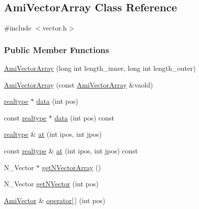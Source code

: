 \hypertarget{classamici_1_1_ami_vector_array}{}\subsection{Ami\+Vector\+Array Class Reference}
\label{classamici_1_1_ami_vector_array}


{\ttfamily \#include $<$vector.\+h$>$}

\subsubsection*{Public Member Functions}
\begin{DoxyCompactItemize}
\item 
\mbox{\hyperlink{classamici_1_1_ami_vector_array_a331a7814672b817a7c38328e78eaaedd}{Ami\+Vector\+Array}} (long int length\+\_\+inner, long int length\+\_\+outer)
\item 
\mbox{\hyperlink{classamici_1_1_ami_vector_array_a3b40abc4d3e4fc0a097834dd56666f41}{Ami\+Vector\+Array}} (const \mbox{\hyperlink{classamici_1_1_ami_vector_array}{Ami\+Vector\+Array}} \&vaold)
\item 
\mbox{\hyperlink{namespaceamici_a1bdce28051d6a53868f7ccbf5f2c14a3}{realtype}} $\ast$ \mbox{\hyperlink{classamici_1_1_ami_vector_array_a5c1b7077b31d3a3be1370ea3e42d13a3}{data}} (int pos)
\item 
const \mbox{\hyperlink{namespaceamici_a1bdce28051d6a53868f7ccbf5f2c14a3}{realtype}} $\ast$ \mbox{\hyperlink{classamici_1_1_ami_vector_array_a862fe8497e94d2fac86e92a07db04cd7}{data}} (int pos) const
\item 
\mbox{\hyperlink{namespaceamici_a1bdce28051d6a53868f7ccbf5f2c14a3}{realtype}} \& \mbox{\hyperlink{classamici_1_1_ami_vector_array_a214f110ad614eb97ec2c6f3b6a9f2c8c}{at}} (int ipos, int jpos)
\item 
const \mbox{\hyperlink{namespaceamici_a1bdce28051d6a53868f7ccbf5f2c14a3}{realtype}} \& \mbox{\hyperlink{classamici_1_1_ami_vector_array_ab5d671e207475d1f45227a7faaeebfac}{at}} (int ipos, int jpos) const
\item 
N\+\_\+\+Vector $\ast$ \mbox{\hyperlink{classamici_1_1_ami_vector_array_a5ccad03e89676a4b404322899579f961}{get\+N\+Vector\+Array}} ()
\item 
N\+\_\+\+Vector \mbox{\hyperlink{classamici_1_1_ami_vector_array_a387bfb58f20388d99da7f946a3a27ab8}{get\+N\+Vector}} (int pos)
\item 
\mbox{\hyperlink{classamici_1_1_ami_vector}{Ami\+Vector}} \& \mbox{\hyperlink{classamici_1_1_ami_vector_array_a337287b17e675970226a55ae63ad65a2}{operator\mbox{[}$\,$\mbox{]}}} (int pos)

\end{DoxyCompactItemize}
